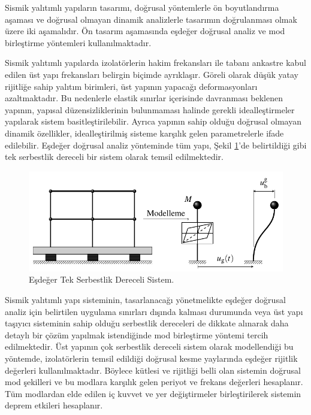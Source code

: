 Sismik yalıtımlı yapıların tasarımı, doğrusal yöntemlerle ön boyutlandırma
aşaması ve doğrusal olmayan dinamik analizlerle tasarımın doğrulanması
olmak üzere iki aşamalıdır. Ön tasarım aşamasında eşdeğer doğrusal
analiz ve mod birleştirme yöntemleri kullanılmaktadır.

Sismik yalıtımlı yapılarda izolatörlerin hakim frekansları ile tabanı
ankastre kabul edilen üst yapı frekansları belirgin biçimde ayrıklaşır.
Göreli olarak düşük yatay rijitliğe sahip yalıtım birimleri, üst yapının
yapacağı deformasyonları azaltmaktadır. Bu nedenlerle elastik sınırlar
içerisinde davranması beklenen yapının, yapısal düzensizliklerinin
bulunmaması halinde gerekli idealleştirmeler yapılarak sistem basitleştirilebilir.
Ayrıca yapının sahip olduğu doğrusal olmayan dinamik özellikler, idealleştirilmiş
sisteme karşılık gelen parametrelerle ifade edilebilir. Eşdeğer doğrusal
analiz yönteminde tüm yapı, Şekil \ref{fig:equivalentmodel}'de belirtildiği
gibi tek serbestlik dereceli bir sistem olarak temsil edilmektedir.
\begin{figure}[h!]
\centering{}\includegraphics{TikZ/StructuralEquivalentModel} \caption{\label{fig:equivalentmodel} Eşdeğer Tek Serbestlik Dereceli Sistem.}
\end{figure}

Sismik yalıtımlı yapı sisteminin, tasarlanacağı yönetmelikte eşdeğer
doğrusal analiz için belirtilen uygulama sınırları dışında kalması
durumunda veya üst yapı taşıyıcı sisteminin sahip olduğu serbestlik
dereceleri de dikkate alınarak daha detaylı bir çözüm yapılmak istendiğinde
mod birleştirme yöntemi tercih edilmektedir. Üst yapının çok serbestlik
dereceli sistem olarak modellendiği bu yöntemde, izolatörlerin temsil
edildiği doğrusal kesme yaylarında eşdeğer rijitlik değerleri kullanılmaktadır.
Böylece kütlesi ve rijitliği belli olan sistemin doğrusal mod şekilleri
ve bu modlara karşılık gelen periyot ve frekans değerleri hesaplanır.
Tüm modlardan elde edilen iç kuvvet ve yer değiştirmeler birleştirilerek
sistemin deprem etkileri hesaplanır.

